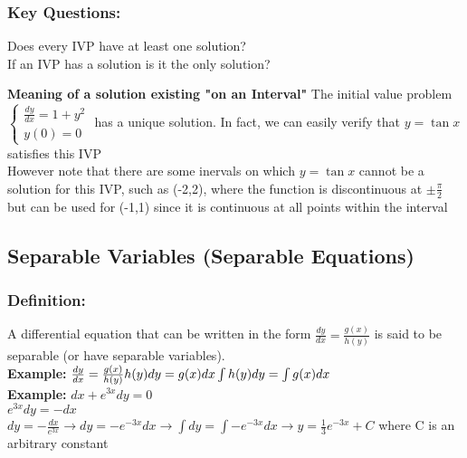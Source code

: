 \documentclass{article}
\begin{document}
\subsubsection{\textbf{Key Questions:}}Does every IVP have at least one solution?\\ If an IVP has a solution is it the only solution?

\textbf{Meaning of a solution existing "on an Interval"}
The initial value problem
\\$\begin{cases}
    \frac{dy}{dx} =1+y^2
    \\ y(0)=0
\end{cases}$ has a unique solution. In fact, we can easily verify that $y=\tan x$ satisfies this IVP
\\ However note that there are some inervals on which $y=\tan x$ cannot be a solution for this IVP, such as (-2,2),
where the function is discontinuous at $\pm \frac{\pi}{2}$ but can be used for (-1,1) since it is continuous at all points within the interval
\subsection{Separable Variables (Separable Equations)}
\subsubsection{\textbf{Definition: }}A differential equation that can be written in the form $\frac{dy}{dx}= \frac{g(x)}{h(y)}$ is said to be separable (or have separable variables).
\\\textbf{Example: } $\frac{dy}{dx}= \frac{g(x)}{h(y)} \\[0.05in]h(y) dy = g(x) dx \\[0.05in] \int{h(y)}{dy} = \int g(x) dx$ 
\\\textbf{Example: } $dx+e^{3x}dy=0$ \\ $e^{3x} dy = -dx$ \\ $dy=-\frac{dx}{e^{3x}}\rightarrow dy=-{e^{-3x}}{dx} \rightarrow \int dy=\int -{e^{-3x}}{dx} \rightarrow y=\frac{1}{3}e^{-3x}+C$ where C is an arbitrary constant
\end{document}
